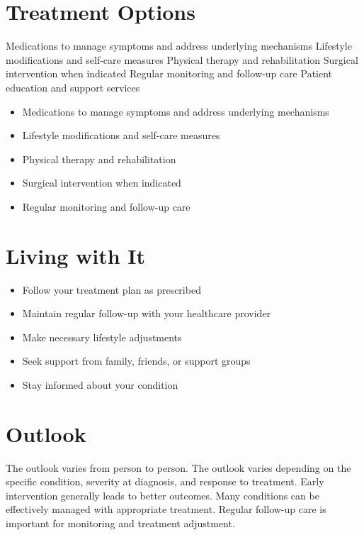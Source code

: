 \section{Treatment Options}
Medications to manage symptoms and address underlying mechanisms Lifestyle modifications and self-care measures Physical therapy and rehabilitation Surgical intervention when indicated Regular monitoring and follow-up care Patient education and support services

\begin{itemize}[noitemsep]
  \item Medications to manage symptoms and address underlying mechanisms
  \item Lifestyle modifications and self-care measures
  \item Physical therapy and rehabilitation
  \item Surgical intervention when indicated
  \item Regular monitoring and follow-up care
\end{itemize}
\section{Living with It}
\begin{itemize}[noitemsep]
  \item Follow your treatment plan as prescribed
  \item Maintain regular follow-up with your healthcare provider
  \item Make necessary lifestyle adjustments
  \item Seek support from family, friends, or support groups
  \item Stay informed about your condition
\end{itemize}
\section{Outlook}
The outlook varies from person to person. The outlook varies depending on the specific condition, severity at diagnosis, and response to treatment. Early intervention generally leads to better outcomes. Many conditions can be effectively managed with appropriate treatment. Regular follow-up care is important for monitoring and treatment adjustment.

